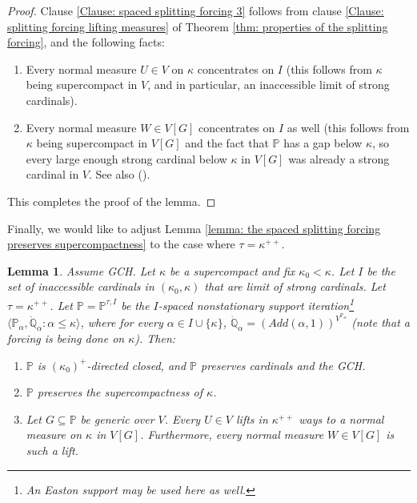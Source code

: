 \documentclass[11pt]{amsart}
\newtheorem{lemma}[theorem]{Lemma}
\theoremstyle{definition}
\theoremstyle{remark}
\newcommand\<{{<}}
\newcommand{\po}{\mathbb{P}}
\newcommand{\qo}{\mathbb{Q}}
\newcommand{\la}{\langle}
\newcommand{\ra}{\rangle}
\begin{document}
\begin{proof}
        \smallskip

        Clause \eqref{Clause: spaced splitting forcing 3} follows from clause \eqref{Clause: splitting forcing lifting measures} of Theorem \ref{thm: properties of the splitting forcing}, and the following facts:
        \begin{enumerate}
            \item Every normal measure $U\in V$ on $\kappa$ concentrates on $I$ (this follows from $\kappa$ being supercompact in $V$, and in particular, an inaccessible limit of strong cardinals). 
            \item Every normal measure $W\in V[G]$ concentrates on $I$ as well (this follows from $\kappa$ being supercompact in $V[G]$ and the fact that $\po$ has a gap below $\kappa$, so every large enough strong cardinal below $\kappa$ in $V[G]$ was already a strong cardinal in $V$. See also (\cite[Corollary 13]{HamkinsGap}).
        \end{enumerate}
        This completes the proof of the lemma.
    \end{proof}


    Finally, we would like to adjust Lemma \ref{lemma: the spaced splitting forcing preserves supercompactness} to the case where $\tau = \kappa^{++}$.
    
    \begin{lemma}\label{lemma: kappa^++ many normal measures}
        Assume GCH. Let $\kappa$ be a supercompact and fix $\kappa_0<\kappa$. Let $I$ be the set of inaccessible cardinals in $(\kappa_0, \kappa)$ that are limit of strong cardinals. Let $\tau = \kappa^{++}$. Let $\po = \po^{\tau,I}$ be the $I$-spaced nonstationary support iteration\footnote{An Easton support may be used here as well.} $\la \po_\alpha, \dot{\qo}_\alpha \colon \alpha\leq\kappa \ra$, where for every $\alpha\in I\cup \{\kappa\}$, $\dot{\qo}_\alpha = (Add(\alpha,1))^{V^{\po_\alpha}}$ (note that a forcing is being done on $\kappa$). Then:
        \begin{enumerate}
            \item $\po$ is $(\kappa_0)^+$-directed closed, and $\po$ preserves cardinals and the {\rm{GCH}}.
            \item $\po$ preserves the supercompactness of $\kappa$.
            \item Let $G\subseteq \po$ be generic over $V$. Every $U\in V$ lifts in $\kappa^{++}$ ways to a normal measure on $\kappa$ in $V[G]$. Furthermore, every normal measure $W\in V[G]$ is such a lift.
        \end{enumerate}
    \end{lemma}
\end{document}
